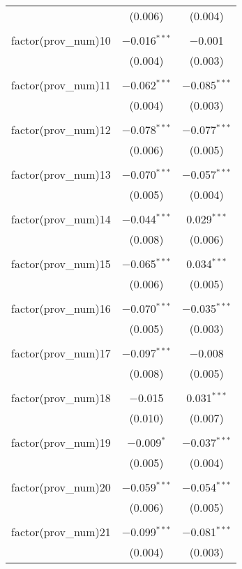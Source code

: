 \begin{table}[!htbp]
\begin{tabular}{@{\extracolsep{5pt}}lcc}
  & (0.006) & (0.004) \\ 
  & & \\ 
 factor(prov\_num)10 & $-$0.016$^{***}$ & $-$0.001 \\ 
  & (0.004) & (0.003) \\ 
  & & \\ 
 factor(prov\_num)11 & $-$0.062$^{***}$ & $-$0.085$^{***}$ \\ 
  & (0.004) & (0.003) \\ 
  & & \\ 
 factor(prov\_num)12 & $-$0.078$^{***}$ & $-$0.077$^{***}$ \\ 
  & (0.006) & (0.005) \\ 
  & & \\ 
 factor(prov\_num)13 & $-$0.070$^{***}$ & $-$0.057$^{***}$ \\ 
  & (0.005) & (0.004) \\ 
  & & \\ 
 factor(prov\_num)14 & $-$0.044$^{***}$ & 0.029$^{***}$ \\ 
  & (0.008) & (0.006) \\ 
  & & \\ 
 factor(prov\_num)15 & $-$0.065$^{***}$ & 0.034$^{***}$ \\ 
  & (0.006) & (0.005) \\ 
  & & \\ 
 factor(prov\_num)16 & $-$0.070$^{***}$ & $-$0.035$^{***}$ \\ 
  & (0.005) & (0.003) \\ 
  & & \\ 
 factor(prov\_num)17 & $-$0.097$^{***}$ & $-$0.008 \\ 
  & (0.008) & (0.005) \\ 
  & & \\ 
 factor(prov\_num)18 & $-$0.015 & 0.031$^{***}$ \\ 
  & (0.010) & (0.007) \\ 
  & & \\ 
 factor(prov\_num)19 & $-$0.009$^{*}$ & $-$0.037$^{***}$ \\ 
  & (0.005) & (0.004) \\ 
  & & \\ 
 factor(prov\_num)20 & $-$0.059$^{***}$ & $-$0.054$^{***}$ \\ 
  & (0.006) & (0.005) \\ 
  & & \\ 
 factor(prov\_num)21 & $-$0.099$^{***}$ & $-$0.081$^{***}$ \\ 
  & (0.004) & (0.003) \\ 

\end{tabular}
\end{table}

